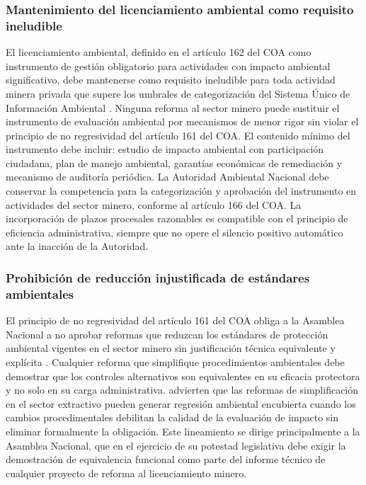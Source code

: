 \subsubsection{Mantenimiento del licenciamiento ambiental como requisito ineludible}

El licenciamiento ambiental, definido en el artículo 162 del COA como instrumento de gestión obligatorio para actividades con impacto ambiental significativo, debe mantenerse como requisito ineludible para toda actividad minera privada que supere los umbrales de categorización del Sistema Único de Información Ambiental \parencite{coa_2017,reglamento_coa_2019}. Ninguna reforma al sector minero puede sustituir el instrumento de evaluación ambiental por mecanismos de menor rigor sin violar el principio de no regresividad del artículo 161 del COA. El contenido mínimo del instrumento debe incluir: estudio de impacto ambiental con participación ciudadana, plan de manejo ambiental, garantías económicas de remediación y mecanismo de auditoría periódica. La Autoridad Ambiental Nacional debe conservar la competencia para la categorización y aprobación del instrumento en actividades del sector minero, conforme al artículo 166 del COA. La incorporación de plazos procesales razonables es compatible con el principio de eficiencia administrativa, siempre que no opere el silencio positivo automático ante la inacción de la Autoridad.

\subsubsection{Prohibición de reducción injustificada de estándares ambientales}

El principio de no regresividad del artículo 161 del COA obliga a la Asamblea Nacional a no aprobar reformas que reduzcan los estándares de protección ambiental vigentes en el sector minero sin justificación técnica equivalente y explícita \parencite{coa_2017,cre_2008}. Cualquier reforma que simplifique procedimientos ambientales debe demostrar que los controles alternativos son equivalentes en su eficacia protectora y no solo en su carga administrativa. \textcite{sanchez_romero_et_al_2026} advierten que las reformas de simplificación en el sector extractivo pueden generar regresión ambiental encubierta cuando los cambios procedimentales debilitan la calidad de la evaluación de impacto sin eliminar formalmente la obligación. Este lineamiento se dirige principalmente a la Asamblea Nacional, que en el ejercicio de su potestad legislativa debe exigir la demostración de equivalencia funcional como parte del informe técnico de cualquier proyecto de reforma al licenciamiento minero.

